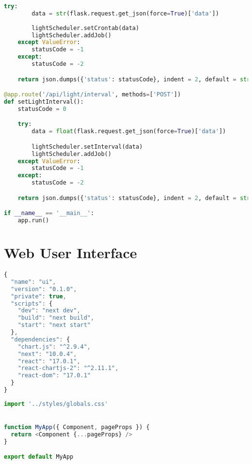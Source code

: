\documentclass[a4paper,12pt,twoside,openright,titlepage]{book}
\begin{document}
\begin{lstlisting}[title={raspberrypi/api/data.py}, language=Python]
    try:
        data = str(flask.request.get_json(force=True)['data'])
        
        lightScheduler.setCrontab(data)
        lightScheduler.addJob()
    except ValueError:
        statusCode = -1
    except:
        statusCode = -2

    return json.dumps({'status': statusCode}, indent = 2, default = str)

@app.route('/api/light/interval', methods=['POST'])
def setLightInterval():
    statusCode = 0

    try:
        data = float(flask.request.get_json(force=True)['data'])

        lightScheduler.setInterval(data)
        lightScheduler.addJob()
    except ValueError:
        statusCode = -1
    except:
        statusCode = -2

    return json.dumps({'status': statusCode}, indent = 2, default = str)

if __name__ == '__main__':
    app.run()
\end{lstlisting}

\section{Web User Interface}
\begin{lstlisting}[title={raspberrypi/ui/package.json}, language=JavaScript]
{
  "name": "ui",
  "version": "0.1.0",
  "private": true,
  "scripts": {
    "dev": "next dev",
    "build": "next build",
    "start": "next start"
  },
  "dependencies": {
    "chart.js": "^2.9.4",
    "next": "10.0.4",
    "react": "17.0.1",
    "react-chartjs-2": "^2.11.1",
    "react-dom": "17.0.1"
  }
}
\end{lstlisting}

\bigskip

\begin{lstlisting}[title={raspberrypi/ui/pages/\_app.js}, language=JavaScript]
import '../styles/globals.css'


function MyApp({ Component, pageProps }) {
  return <Component {...pageProps} />
}

export default MyApp
\end{lstlisting}

\bigskip
\end{document}
